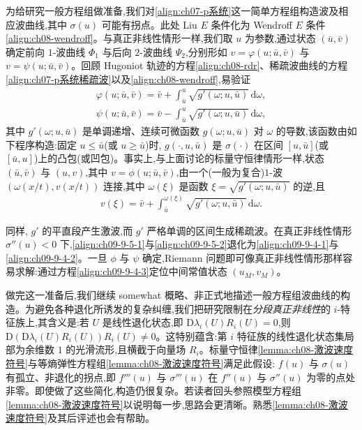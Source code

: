 \documentclass[../../main.tex]{subfiles}
\begin{document}
为给研究一般方程组做准备,我们对\eqref{align:ch07-p系统}这一简单方程组构造波及相应波曲线,其中 $\sigma(u)$ 可能有拐点。此处 Liu $E$ 条件化为 Wendroff $E$ 条件\eqref{align:ch08-wendroff}。与真正非线性情形一样,我们取 $u$ 为参数,通过状态 $(\bar{u},\bar{v})$ 确定前向 $1$-波曲线 $\Phi_{1}$ 与后向 $2$-波曲线 $\Psi_{2}$,分别形如 $v=\varphi(u;\bar{u},\bar{v})$ 与 $v=\psi(u;\bar{u},\bar{v})$。回顾 Hugoniot 轨迹的方程\eqref{align:ch08-rdr}、稀疏波曲线的方程\eqref{align:ch07-p系统稀疏波}以及\eqref{align:ch08-wendroff},易验证
\begin{align}
\varphi(u;\bar{u},\bar{v})=\bar{v}+\int_{\bar{u}}^{u}\sqrt{g'(\omega;u,\bar{u})}\,\mathrm{d}\omega,
\label{align:ch09-9-5-1}
\end{align}
\begin{align}
\psi(u;\bar{u},\bar{v})=\bar{v}-\int_{\bar{u}}^{u}\sqrt{g'(\omega;u,\bar{u})}\,\mathrm{d}\omega,
\label{align:ch09-9-5-2}
\end{align}
其中 $g'(\omega;u,\bar{u})$ 是单调递增、连续可微函数 $g(\omega;u,\bar{u})$ 对 $\omega$ 的导数,该函数由如下程序构造:固定 $u\leqslant\bar{u}$(或 $u\geqslant\bar{u}$)时, $g(\cdot,u,\bar{u})$ 是 $\sigma(\cdot)$ 在区间 $[u,\bar{u}]$(或 $[\bar{u},u]$)上的凸包(或凹包)。事实上,与上面讨论的标量守恒律情形一样,状态 $(\bar{u},\bar{v})$ 与 $(u,v)$,其中 $v=\phi(u;\bar{u},\bar{v})$,由一个(一般为复合)$1$-波 $(\omega(x/t),v(x/t))$ 连接,其中 $\omega(\xi)$ 是函数 $\xi=\sqrt{g'(\omega;u,\bar{u})}$ 的逆,且
\begin{align}
v(\xi)=\bar{v}+\int_{\bar{u}}^{\omega(\xi)}\sqrt{g'(\omega;u,\bar{u})}\,\mathrm{d}\omega.
\label{align:ch09-9-5-3}
\end{align}

同样, $g'$ 的平直段产生激波,而 $g'$ 严格单调的区间生成稀疏波。在真正非线性情形 $\sigma''(u)<0$ 下,\eqref{align:ch09-9-5-1}与\eqref{align:ch09-9-5-2}退化为\eqref{align:ch09-9-4-1}与\eqref{align:ch09-9-4-2}。一旦 $\phi$ 与 $\psi$ 确定,Riemann 问题即可像真正非线性情形那样容易求解:通过方程\eqref{align:ch09-9-4-3}定位中间常值状态 $(u_{M},v_{M})$。

做完这一准备后,我们继续 somewhat 概略、非正式地描述一般方程组波曲线的构造。为避免各种退化所诱发的复杂纠缠,我们把研究限制在\emph{分段真正非线性}的 $i$-特征族上,其含义是:若 $U$ 是线性退化状态,即 $\mathrm{D}\lambda_{i}(U)R_{i}(U)=0$,则 $\mathrm{D}(\mathrm{D}\lambda_{i}(U)R_{i}(U))R_{i}(U)\neq0$。这特别蕴含:第 $i$ 特征族的线性退化状态集局部为余维数 $1$ 的光滑流形,且横截于向量场 $R_{i}$。标量守恒律\cref{lemma:ch08-激波速度符号}与等熵弹性方程组\cref{lemma:ch08-激波速度符号}满足此假设: $f(u)$ 与 $\sigma(u)$ 有孤立、非退化的拐点,即 $f'''(u)$ 与 $\sigma'''(u)$ 在 $f''(u)$ 与 $\sigma''(u)$ 为零的点处非零。即使做了这些简化,构造仍很复杂。若读者回头参照模型方程组\cref{lemma:ch08-激波速度符号}以说明每一步,思路会更清晰。熟悉\cref{lemma:ch08-激波速度符号}及其后评述也会有帮助。
\end{document}
